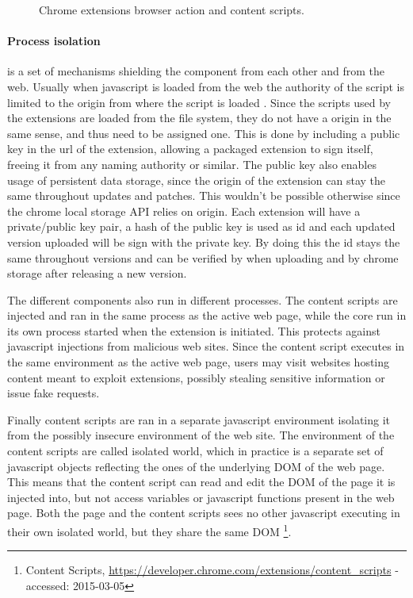 \begin{figure}[h]
    \caption{Chrome extensions browser action and content scripts.}
    \label{extension-ux}
\end{figure}

\paragraph{Process isolation} is a set of mechanisms shielding the component from each other and from the web. Usually when javascript is loaded from the web the authority of the script is limited to the origin from where the script is loaded \cite{protecting-browsers}. Since the scripts used by the extensions are loaded from the file system, they do not have a origin in the same sense, and thus need to be assigned one. This is done by including a public key in the url of the extension, allowing a packaged extension to sign itself, freeing it from any naming authority or similar. The public key also enables usage of persistent data storage, since the origin of the extension can stay the same throughout updates and patches. This wouldn't be possible otherwise since the chrome local storage API relies on origin. Each extension will have a private/public key pair, a hash of the public key is used as id and each updated version uploaded will be sign with the private key. By doing this the id stays the same throughout versions and can be verified by when uploading and by chrome storage after releasing a new version. 


\par The different components also run in different processes. The content scripts are injected and ran in the same process as the active web page, while the core run in its own process started when the extension is initiated. This protects against javascript injections from malicious web sites\cite{javascript-injection}. Since the content script executes in the same environment as the active web page, users may visit websites hosting content meant to exploit extensions\cite{carlini-chrome}, possibly stealing sensitive information or issue fake requests.
\par Finally content scripts are ran in a separate javascript environment isolating it from the possibly insecure environment of the web site. The environment of the content scripts are called isolated world, which in practice is a separate set of javascript objects reflecting the ones of the underlying DOM of the web page. This means that the content script can read and edit the DOM of the page it is injected into, but not access variables or javascript functions present in the web page. Both the page and the content scripts sees no other javascript executing in their own isolated world, but they share the same DOM \footnote{Content Scripts, \url{https://developer.chrome.com/extensions/content_scripts} - accessed: 2015-03-05}.


